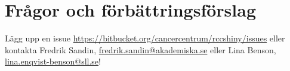 \documentclass[12pt, a4paper,twoside]{report}
\begin{document}
\section{Frågor och förbättringsförslag}
Lägg upp en issue \url{https://bitbucket.org/cancercentrum/rccshiny/issues} eller kontakta Fredrik Sandin, \href{mailto:fredrik.sandin@akademiska.se}{fredrik.sandin@akademiska.se} eller Lina Benson, \\
\href{mailto:lina.enqvist-benson@sll.se}{lina.enqvist-benson@sll.se}!
\end{document}
